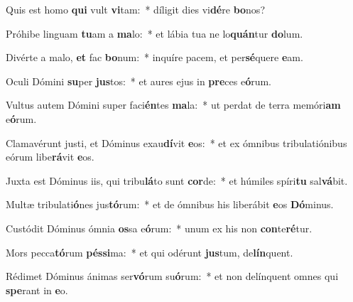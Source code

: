 \item Quis est homo \textbf{qui} vult \textbf{vi}tam:~* díligit dies vi\textbf{dé}re \textbf{bo}nos?
\item Próhibe linguam \textbf{tu}am a \textbf{ma}lo:~* et lábia tua ne lo\textbf{quán}tur \textbf{do}lum.
\item Divérte a malo, \textbf{et} fac \textbf{bo}num:~* inquíre pacem, et per\textbf{sé}quere \textbf{e}am.
\item Oculi Dómini \textbf{su}per \textbf{jus}tos:~* et aures ejus in \textbf{pre}ces e\textbf{ó}rum.
\item Vultus autem Dómini super faci\textbf{én}tes \textbf{ma}la:~* ut perdat de terra memóri\textbf{am} e\textbf{ó}rum.
\item Clamavérunt justi, et Dóminus exau\textbf{dí}vit \textbf{e}os:~* et ex ómnibus tribulatiónibus eórum libe\textbf{rá}vit \textbf{e}os.
\item Juxta est Dóminus iis, qui tribu\textbf{lá}to sunt \textbf{cor}de:~* et húmiles spíri\textbf{tu} sal\textbf{vá}bit.
\item Multæ tribulati\textbf{ó}nes jus\textbf{tó}rum:~* et de ómnibus his liberábit \textbf{e}os \textbf{Dó}minus.
\item Custódit Dóminus ómnia \textbf{os}sa e\textbf{ó}rum:~* unum ex his non \textbf{con}te\textbf{ré}tur.
\item Mors pecca\textbf{tó}rum \textbf{pés}\textbf{si}ma:~* et qui odérunt \textbf{jus}tum, de\textbf{lín}quent.
\item Rédimet Dóminus ánimas ser\textbf{vó}rum su\textbf{ó}rum:~* et non delínquent omnes qui \textbf{spe}rant in \textbf{e}o.
